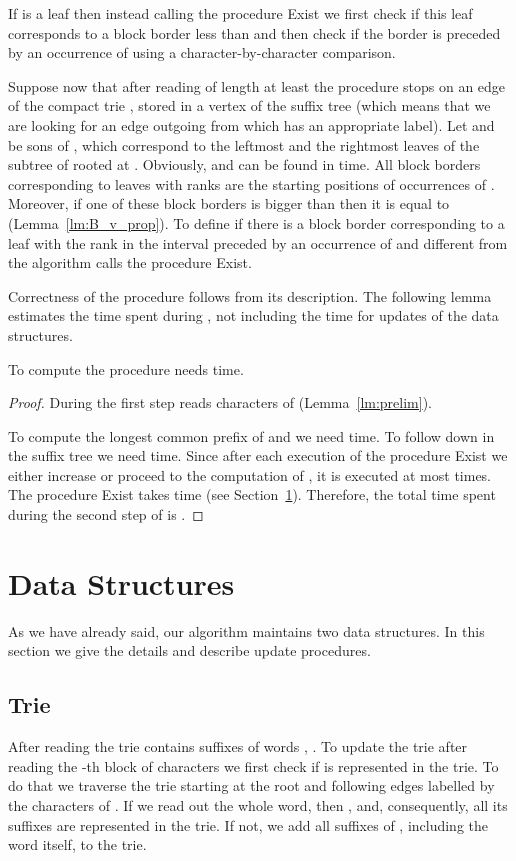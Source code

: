 \documentclass[10pt]{llncs}
\newcommand{\exist}{{\sc Exist}}
\begin{document}
If  is a leaf then instead calling the procedure \exist{} we first check if this leaf corresponds to a block border less than  and then check if the border is preceded by an occurrence of  using a character-by-character comparison. 

Suppose now that after reading  of length at least  the procedure stops on an edge  of the compact trie , stored in a vertex  of the suffix tree (which means that we are looking for an edge outgoing from  which has an appropriate label). Let  and  be sons of , which correspond to the leftmost and the rightmost leaves of the subtree of  rooted at . Obviously,  and  can be found in  time. All block borders corresponding to leaves with ranks  are the starting positions of occurrences of . Moreover, if one of these block borders is bigger than  then it is equal to  (Lemma~\ref{lm:B_v_prop}). To define if there is a block border corresponding to a leaf with the rank in the interval  preceded by an occurrence of  and different from  the algorithm calls the procedure \exist{}.

Correctness of the procedure  follows from its description. The following lemma estimates the time spent during , not including the time for updates of the data structures.

\begin{lemma}
\label{lm:second_step}
To compute  the procedure  needs  time.
\end{lemma}
\begin{proof}
During the first step  reads  characters of  (Lemma~\ref{lm:prelim}).

To compute the longest common prefix of  and  we need  time. To follow  down in the suffix tree we need  time. Since after each execution of the procedure \exist{} we either increase  or proceed to the computation of , it is executed at most  times. The procedure \exist{} takes  time (see Section~\ref{sec:DS}). Therefore, the total time spent during the second step of  is .
\end{proof}


\section{Data Structures}
\label{sec:DS}
As we have already said, our algorithm maintains two data structures. In this section we give the details and describe update procedures.

\subsection{Trie}
After reading  the trie contains suffixes of words , . To update the trie after reading the -th block of characters we first check if  is represented in the trie. To do that we traverse the trie starting at the root and following edges labelled by the characters of . If we read out the whole word, then , and, consequently, all its suffixes are represented in the trie. If not, we add all suffixes of , including the word itself, to the trie. 
\end{document}
